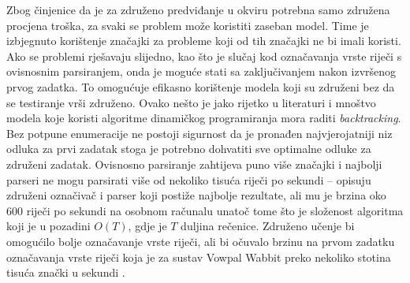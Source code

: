 Zbog činjenice da je za združeno predviđanje u \lts{} okviru potrebna samo
združena procjena troška, za svaki se problem može koristiti zaseban model. Time
je izbjegnuto korištenje značajki za probleme koji od tih značajki ne bi imali
koristi. Ako se problemi rješavaju slijedno, kao što je slučaj kod označavanja
vrste riječi s ovisnosnim parsiranjem, onda je moguće stati sa zaključivanjem
nakon izvršenog prvog zadatka. To omogućuje efikasno korištenje modela koji su
združeni bez da se testiranje vrši združeno. Ovako nešto je jako rijetko u
literaturi i mnoštvo modela koje koristi algoritme dinamičkog programiranja mora
raditi \textit{backtracking}. Bez potpune enumeracije ne postoji sigurnost da je
pronađen najvjerojatniji niz odluka za prvi zadatak stoga je potrebno dohvatiti
sve optimalne odluke za združeni zadatak. Ovisnosno parsiranje zahtijeva puno
više značajki i najbolji parseri ne mogu parsirati više od nekoliko tisuća
riječi po sekundi -- \citet{andor2016globally} opisuju združeni označivač i
parser koji postiže najbolje rezultate, ali mu je brzina oko 600 riječi po
sekundi na osobnom računalu unatoč tome što je složenost algoritma koji je u
pozadini $O(T)$, gdje je $T$ duljina rečenice. Združeno učenje bi omogućilo
bolje označavanje vrste riječi, ali bi očuvalo brzinu na prvom zadatku
označavanja vrste riječi koja je za sustav Vowpal Wabbit preko nekoliko stotina
tisuća znački u sekundi \citep{daume14lts}.
